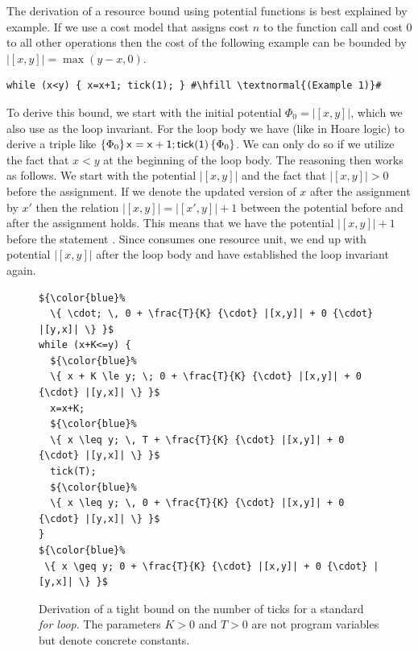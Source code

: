\documentclass[nocopyrightspace,preprint,pldi]{sigplanconf-pldi15}
\begin{document}
The derivation of a resource bound using potential functions is best
explained by example.  If we use a cost model that assigns cost $n$ to
the function call  and cost $0$ to all other operations
then the cost of the following example can be bounded by
$|[x,y]| = \max(y{-}x,0)$.%
\begin{lstlisting}[basicstyle=\tt\small]
while (x<y) { x=x+1; tick(1); } #\hfill \textnormal{(Example 1)}#
\end{lstlisting}
To derive this bound, we start with the initial potential $\Phi_0 =
|[x,y]|$, which
we also use as the loop invariant.  For the loop body we have (like in
Hoare logic) to derive a triple like
$\{\Phi_0\}\, \mathsf{x=x+1;tick(1)}\, \{\Phi_0\}$.  We can only do so
if we utilize the fact that $x<y$ at the beginning of the loop body.
The reasoning then works as follows. We start with the potential
$|[x,y]|$ and the fact that $|[x,y]| > 0$ before the assignment.  If
we denote the updated version of $x$ after the assignment by $x'$ then
the relation $|[x,y]| = |[x',y]| + 1$ between the potential before and
after the assignment  holds.  This means that we have the
potential $|[x,y]| + 1$ before the statement .  Since
 consumes one resource unit, we end up with potential
$|[x,y]|$ after the loop body and have established the loop invariant
again.



\begin{figure}[t]
  \centering
\vspace{-1.5ex}
\begin{lstlisting}[mathescape]
${\color{blue}%
  \{ \cdot; \, 0 + \frac{T}{K} {\cdot} |[x,y]| + 0 {\cdot} |[y,x]| \} }$
while (x+K<=y) {
  ${\color{blue}%
  \{ x + K \le y; \; 0 + \frac{T}{K} {\cdot} |[x,y]| + 0 {\cdot} |[y,x]| \} }$
  x=x+K;
  ${\color{blue}%
  \{ x \leq y; \, T + \frac{T}{K} {\cdot} |[x,y]| + 0 {\cdot} |[y,x]| \} }$
  tick(T);
  ${\color{blue}%
  \{ x \leq y; \, 0 + \frac{T}{K} {\cdot} |[x,y]| + 0 {\cdot} |[y,x]| \} }$
}
${\color{blue}%
 \{ x \geq y; 0 + \frac{T}{K} {\cdot} |[x,y]| + 0 {\cdot} |[y,x]| \} }$
\end{lstlisting}
  \caption{Derivation of a tight bound on the number of
    ticks for a standard \emph{for loop}.  The parameters $K>0$ and
    $T>0$ are not program variables but denote concrete constants.
  }
  \label{fig:ex1}
\end{figure}
\end{document}
